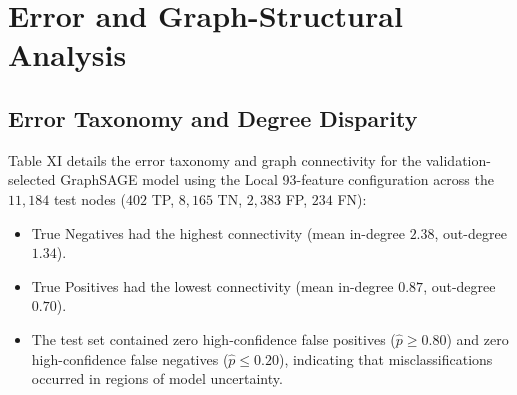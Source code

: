 \documentclass[conference]{IEEEtran}
\begin{document}
\section{Error and Graph-Structural Analysis}

\subsection{Error Taxonomy and Degree Disparity}
Table XI details the error taxonomy and graph connectivity for the validation-selected GraphSAGE model using the Local 93-feature configuration across the $11,184$ test nodes ($402$ TP, $8,165$ TN, $2,383$ FP, $234$ FN):
\begin{itemize}
    \item True Negatives had the highest connectivity (mean in-degree $2.38$, out-degree $1.34$).
    \item True Positives had the lowest connectivity (mean in-degree $0.87$, out-degree $0.70$).
    \item The test set contained zero high-confidence false positives ($\hat{p} \ge 0.80$) and zero high-confidence false negatives ($\hat{p} \le 0.20$), indicating that misclassifications occurred in regions of model uncertainty.
\end{itemize}

\begin{table}[htbp]
\centering
\caption{Error and Graph-Structural Taxonomy for Validation-Selected GraphSAGE (Local 93 Features, Test Set, $N = 11,184$)}
\label{tab:error_taxonomy}
{\small
{}
}
\end{table}
\end{document}
